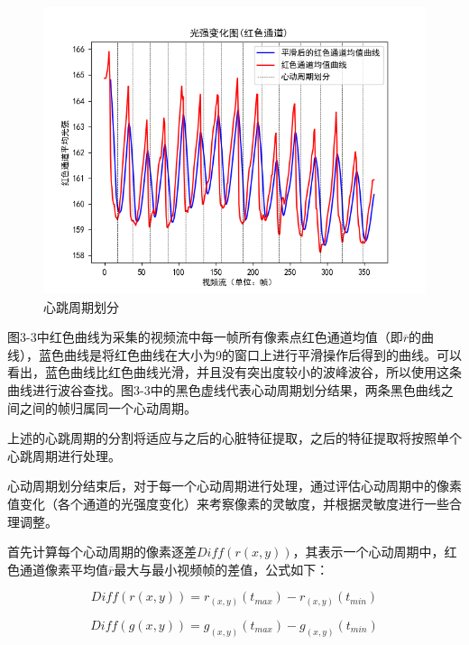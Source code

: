 \begin{figure}[htbp]
  \centering
  \includegraphics[width=0.9\linewidth]{images/Figure_37.png}
  \caption{心跳周期划分}\label{3-4} %
\end{figure}
\par
{图3-3中红色曲线为采集的视频流中每一帧所有像素点红色通道均值（即$\overline{r}$的曲线），蓝色曲线是将红色曲线在大小为9的窗口上进行平滑操作后得到的曲线。可以看出，蓝色曲线比红色曲线光滑，并且没有突出度较小的波峰波谷，所以使用这条曲线进行波谷查找。图3-3中的黑色虚线代表心动周期划分结果，两条黑色曲线之间之间的帧归属同一个心动周期。}
\par
{上述的心跳周期的分割将适应与之后的心脏特征提取，之后的特征提取将按照单个心跳周期进行处理。}

\par
{心动周期划分结束后，对于每一个心动周期进行处理，通过评估心动周期中的像素值变化（各个通道的光强度变化）来考察像素的灵敏度，并根据灵敏度进行一些合理调整。}
\par
{首先计算每个心动周期的像素逐差$ Diff(r(x,y)) $，其表示一个心动周期中，红色通道像素平均值$ \overline{r} $最大与最小视频帧的差值，公式如下：}

\begin{equation}
    Diff(r(x,y))=r_{(x,y)}(t_{max})- r_{(x,y)}(t_{min})
\end{equation}

\begin{equation}
    Diff(g(x,y))=g_{(x,y)}(t_{max})- g_{(x,y)}(t_{min})
\end{equation}


